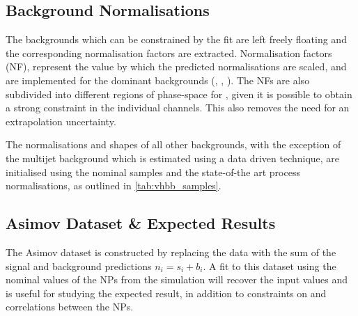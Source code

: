 \subsection{Background Normalisations}

The backgrounds which can be constrained by the fit are left freely floating and the corresponding normalisation factors are
extracted. 
Normalisation factors (NF), represent the value by which the predicted normalisations are scaled, and are implemented for the dominant backgrounds
(\ttbar, \Zhf, \Whf).
The NFs are also subdivided into different regions of phase-space for \ttbar, given it is possible to obtain a strong constraint in the individual channels.
This also removes the need for an extrapolation uncertainty.



The normalisations and shapes of all other backgrounds, with the exception of the multijet background which is estimated using a data driven technique, are initialised using the nominal samples and the state-of-the art process normalisations, as outlined in \cref{tab:vhbb_samples}.


\subsection{Asimov Dataset \& Expected Results}\label{sec:fit_expected}

The Asimov dataset is constructed by replacing the data with the sum of the signal and background predictions $n_i = s_i + b_i$.
A fit to this dataset using the nominal values of the NPs from the simulation will recover the input values and is useful for studying the expected result, in addition to constraints on and correlations between the NPs.

